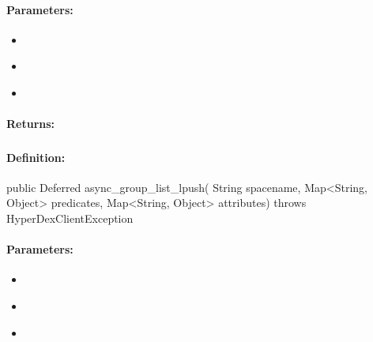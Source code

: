 \paragraph{Parameters:}
\begin{itemize}[noitemsep]
\item {}\\

\item {}\\

\item {}\\

\end{itemize}

\paragraph{Returns:}


\pagebreak
\subsubsection{}
\label{api:java:async_group_list_lpush}


\paragraph{Definition:}
\begin{javacode}
public Deferred async_group_list_lpush(
        String spacename,
        Map<String, Object> predicates,
        Map<String, Object> attributes) throws HyperDexClientException
\end{javacode}

\paragraph{Parameters:}
\begin{itemize}[noitemsep]
\item {}\\

\item {}\\

\item {}\\

\end{itemize}

